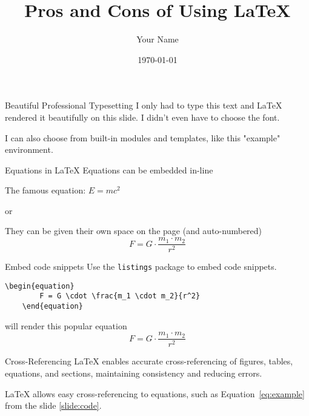\documentclass{beamer}
\title{Pros and Cons of Using LaTeX}
\author{Your Name}
\date{\today}
\begin{document}
\begin{frame}
    \titlepage
\end{frame}

\begin{frame}{Beautiful Professional Typesetting}
    I only had to type this text and LaTeX rendered it beautifully on this slide. I didn't even have to choose the font. 
    \begin{example}
    I can also choose from built-in modules and templates, like this "example" environment. 
    \end{example}
\end{frame}

\begin{frame}{Equations in LaTeX}
Equations can be embedded in-line
\begin{example}
    The famous equation: $E=mc^2$
\end{example}
or
\begin{example}
    They can be given their own space on the page (and auto-numbered)
    \begin{equation}
        F = G \cdot \frac{m_1 \cdot m_2}{r^2}
    \end{equation}
\end{example}
\end{frame}

\begin{frame}[fragile]{Embed code snippets}\label{slide:code}
    Use the \lstinline|listings| package to embed code snippets.
    \begin{example}
      \begin{lstlisting}[mathescape]
    \begin{equation}
        F = G \cdot \frac{m_1 \cdot m_2}{r^2}
    \end{equation}
    \end{lstlisting} will render this popular equation \cite{einstein1905}
    \begin{equation}\label{eq:example}
        F = G \cdot \frac{m_1 \cdot m_2}{r^2}
    \end{equation}
    
    \end{example}
    
    
\end{frame}
\begin{frame}{Cross-Referencing}
    LaTeX enables accurate cross-referencing of figures, tables, equations, and sections, maintaining consistency and reducing errors.
    
    \begin{example}
        LaTeX allows easy cross-referencing to equations, such as Equation~\ref{eq:example} from the slide \ref{slide:code}.
    \end{example}
\end{frame}
\end{document}
